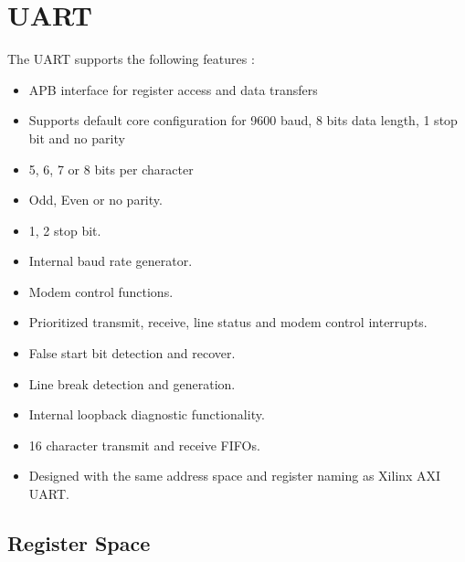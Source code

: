 \documentclass[12pt,a4paper]{report}
\begin{document}
\section{UART}

The UART supports the following features :
\begin{itemize}
\item APB interface for register access and data transfers
\item Supports default core configuration for 9600 baud, 8 bits data length, 1 stop bit and no parity
\item 5, 6, 7 or 8 bits per character
\item Odd, Even or no parity.
\item 1, 2 stop bit.
\item Internal baud rate generator.
\item Modem control functions.
\item Prioritized transmit, receive, line status and modem control interrupts.
\item False start bit detection and recover.
\item Line break detection and generation.
\item Internal loopback diagnostic functionality.
\item 16 character transmit and receive FIFOs.
\item Designed with the same address space and register naming as Xilinx AXI UART.
\end{itemize}
\subsection{Register Space}
\end{document}
